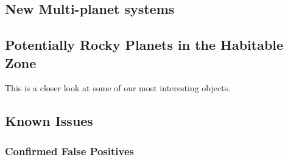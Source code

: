 
\subsection{New Multi-planet systems}
\subsection{Potentially Rocky Planets in the Habitable Zone}
This is a closer look at some of our most interesting objects.
\subsection{Known Issues}
\subsubsection{Confirmed False Positives}

